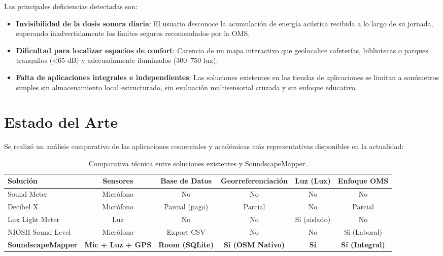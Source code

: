 \documentclass[12pt,a4paper]{article}
\begin{document}
Las principales deficiencias detectadas son:
\begin{itemize}[leftmargin=*]
    \item \textbf{Invisibilidad de la dosis sonora diaria}: El usuario desconoce la acumulación de energía acústica recibida a lo largo de su jornada, superando inadvertidamente los límites seguros recomendados por la OMS.
    \item \textbf{Dificultad para localizar espacios de confort}: Carencia de un mapa interactivo que geolocalice cafeterías, bibliotecas o parques tranquilos (<65 dB) y adecuadamente iluminados (300--750 lux).
    \item \textbf{Falta de aplicaciones integrales e independientes}: Las soluciones existentes en las tiendas de aplicaciones se limitan a sonómetros simples sin almacenamiento local estructurado, sin evaluación multisensorial cruzada y sin enfoque educativo.
\end{itemize}

\section{Estado del Arte}

Se realizó un análisis comparativo de las aplicaciones comerciales y académicas más representativas disponibles en la actualidad:

\begin{table}[H]
\centering
\small
\caption{Comparativa técnica entre soluciones existentes y SoundscapeMapper.}
\begin{tabularx}{\textwidth}{lccccc}
\toprule
\textbf{Solución} & \textbf{Sensores} & \textbf{Base de Datos} & \textbf{Georreferenciación} & \textbf{Luz (Lux)} & \textbf{Enfoque OMS} \\
\midrule
Sound Meter & Micrófono & No & No & No & No \\
Decibel X & Micrófono & Parcial (pago) & Parcial & No & Parcial \\
Lux Light Meter & Luz & No & No & Sí (aislado) & No \\
NIOSH Sound Level & Micrófono & Export CSV & No & No & Sí (Laboral) \\
\textbf{SoundscapeMapper} & \textbf{Mic + Luz + GPS} & \textbf{Room (SQLite)} & \textbf{Sí (OSM Nativo)} & \textbf{Sí} & \textbf{Sí (Integral)} \\
\bottomrule
\end{tabularx}
\end{table}
\end{document}
